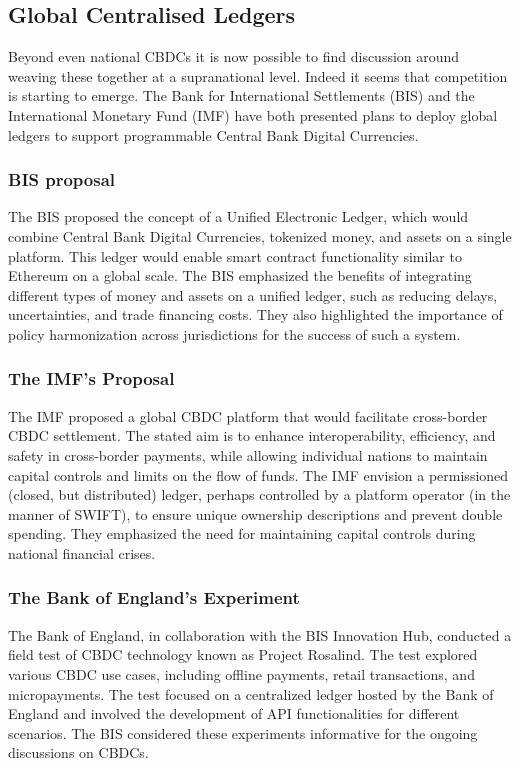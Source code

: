\begin{itemize}
\subsection{Global Centralised Ledgers}

Beyond even national CBDCs it is now possible to find discussion around weaving these together at a supranational level. Indeed it seems that competition is starting to emerge. The Bank for International Settlements (BIS) and the International Monetary Fund (IMF) have both presented plans to deploy global ledgers to support programmable Central Bank Digital Currencies. 
\subsubsection{BIS proposal}
The BIS proposed the concept of a Unified Electronic Ledger, which would combine Central Bank Digital Currencies, tokenized money, and assets on a single platform. This ledger would enable smart contract functionality similar to Ethereum on a global scale. The BIS emphasized the benefits of integrating different types of money and assets on a unified ledger, such as reducing delays, uncertainties, and trade financing costs. They also highlighted the importance of policy harmonization across jurisdictions for the success of such a system.

\subsubsection{The IMF's Proposal}
The IMF proposed a global CBDC platform that would facilitate cross-border CBDC settlement. The stated aim is to enhance interoperability, efficiency, and safety in cross-border payments, while allowing individual nations to maintain capital controls and limits on the flow of funds. The IMF envision a permissioned (closed, but distributed) ledger, perhaps controlled by a platform operator (in the manner of SWIFT), to ensure unique ownership descriptions and prevent double spending. They emphasized the need for maintaining capital controls during national financial crises.

\subsubsection{The Bank of England's Experiment}
The Bank of England, in collaboration with the BIS Innovation Hub, conducted a field test of CBDC technology known as Project Rosalind. The test explored various CBDC use cases, including offline payments, retail transactions, and micropayments. The test focused on a centralized ledger hosted by the Bank of England and involved the development of API functionalities for different scenarios. The BIS considered these experiments informative for the ongoing discussions on CBDCs.


\end{itemize}
